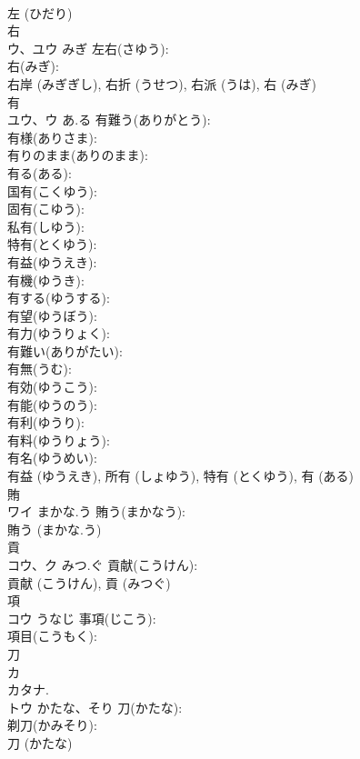 \documentclass[8pt]{extreport}
\begin{document}
\begin{CJK}{UTF8}{min}
\\	左 (ひだり)
\\	右			
\\	ウ、ユウ	みぎ	左右(さゆう): 
\\	右(みぎ): 
\\	右岸 (みぎぎし), 右折 (うせつ), 右派 (うは), 右 (みぎ)
\\	有			
\\	ユウ、ウ	あ.る	有難う(ありがとう): 
\\	有様(ありさま): 
\\	有りのまま(ありのまま): 
\\	有る(ある): 
\\	国有(こくゆう): 
\\	固有(こゆう): 
\\	私有(しゆう): 
\\	特有(とくゆう): 
\\	有益(ゆうえき): 
\\	有機(ゆうき): 
\\	有する(ゆうする): 
\\	有望(ゆうぼう): 
\\	有力(ゆうりょく): 
\\	有難い(ありがたい): 
\\	有無(うむ): 
\\	有効(ゆうこう): 
\\	有能(ゆうのう): 
\\	有利(ゆうり): 
\\	有料(ゆうりょう): 
\\	有名(ゆうめい): 
\\	有益 (ゆうえき), 所有 (しょゆう), 特有 (とくゆう), 有 (ある)
\\	賄			
\\	ワイ	まかな.う	賄う(まかなう): 
\\	賄う (まかな.う)
\\	貢			
\\	コウ、ク	みつ.ぐ	貢献(こうけん): 
\\	貢献 (こうけん), 貢 (みつぐ)
\\	項			
\\	コウ	うなじ	事項(じこう): 
\\	項目(こうもく): 
\\	刀			
\\	カ 
\\	カタナ.	
\\	トウ	かたな、そり	刀(かたな): 
\\	剃刀(かみそり): 
\\	刀 (かたな)

\end{CJK}
\end{document}
